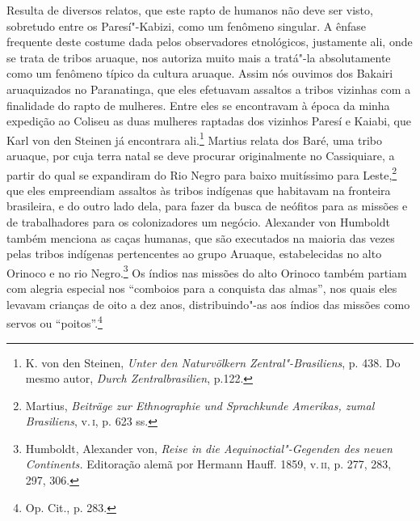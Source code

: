 
Resulta de diversos relatos, que este rapto de humanos não deve ser
visto, sobretudo entre os Paresí"-Kabizi, como um fenômeno singular. A
ênfase frequente deste costume dada pelos observadores etnológicos,
justamente ali, onde se trata de tribos aruaque, nos autoriza muito mais
a tratá"-la absolutamente como um fenômeno típico da cultura aruaque.
Assim nós ouvimos dos Bakairi aruaquizados no Paranatinga, que eles
efetuavam assaltos a tribos vizinhas com a finalidade do rapto de
mulheres. Entre eles se encontravam à época da minha expedição ao
Coliseu as duas mulheres raptadas dos vizinhos Paresí e Kaiabi, que Karl
von den Steinen já encontrara ali.\footnote{K. von den Steinen,
  \emph{Unter den Naturvölkern Zentral"-Brasiliens}, p. 438. Do mesmo
  autor, \emph{Durch Zentralbrasilien}, p.122.} Martius relata dos
Baré, uma tribo aruaque, por cuja terra natal se deve procurar
originalmente no Cassiquiare, a partir do qual se expandiram do Rio
Negro para baixo muitíssimo para Leste,\footnote{Martius, \emph{Beiträge
  zur Ethnographie und Sprachkunde Amerikas, zumal Brasiliens}, v.\,\textsc{i},
  p. 623 ss.} que eles empreendiam assaltos às tribos indígenas que
habitavam na fronteira brasileira, e do outro lado dela, para fazer da
busca de neófitos para as missões e de trabalhadores para os
colonizadores um negócio. Alexander von Humboldt também menciona as
caças humanas, que são executados na maioria das vezes pelas tribos
indígenas pertencentes ao grupo Aruaque, estabelecidas no alto Orinoco e
no rio Negro.\footnote{Humboldt, Alexander von, \emph{Reise in die
  Aequinoctial"-Gegenden des neuen Continents.} Editoração alemã por
  Hermann Hauff. 1859, v.\,\textsc{ii}, p. 277, 283, 297, 306.} Os índios nas
missões do alto Orinoco também partiam com alegria especial nos
``comboios para a conquista das almas'', nos quais eles levavam
crianças de oito a dez anos, distribuindo"-as aos índios das missões como
servos ou ``poitos''.\footnote{Op. Cit., p. 283.}

